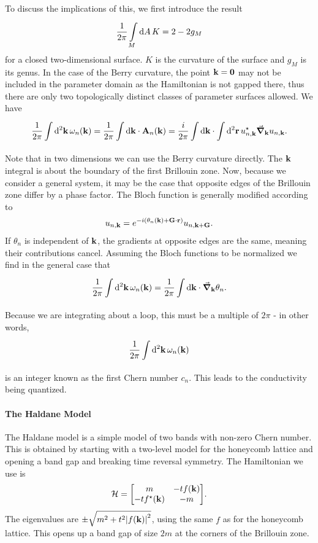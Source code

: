 To discuss the implications of this, we first introduce the result
\begin{align*}
	\frac{1}{2\pi}\int\limits_{M}^{}\dd{A}K = 2 - 2g_{M}
\end{align*}
for a closed two-dimensional surface. $K$ is the curvature of the surface and $g_{M}$ is its genus. In the case of the Berry curvature, the point $\vb{k} = \vb{0}$ may not be included in the parameter domain as the Hamiltonian is not gapped there, thus there are only two topologically distinct classes of parameter surfaces allowed. We have
\begin{align*}
	\frac{1}{2\pi}\int\limits_{}^{}\dd[2]{\vb{k}}\omega_{n}(\vb{k}) = \frac{1}{2\pi}\int\limits_{}^{}\dd{\vb{k}}\cdot\vb{A}_{n}(\vb{k}) = \frac{i}{2\pi}\int\limits_{}^{}\dd{\vb{k}}\cdot\int\limits_{}^{}\dd[2]{\vb{r}}u_{n, \vb{k}}^{\star}\grad_{\vb{k}}u_{n, \vb{k}}.
\end{align*}
Note that in two dimensions we can use the Berry curvature directly. The $\vb{k}$ integral is about the boundary of the first Brillouin zone. Now, because we consider a general system, it may be the case that opposite edges of the Brillouin zone differ by a phase factor. The Bloch function is generally modified according to
\begin{align*}
	u_{n, \vb{k}} = e^{-i(\theta_{n}(\vb{k}) + \vb{G}\cdot\vb{r})}u_{n, \vb{k} + \vb{G}}.
\end{align*}
If $\theta_{n}$ is independent of $\vb{k}$, the gradients at opposite edges are the same, meaning their contributions cancel. Assuming the Bloch functions to be normalized we find in the general case that
\begin{align*}
	\frac{1}{2\pi}\int\limits_{}^{}\dd[2]{\vb{k}}\omega_{n}(\vb{k}) = \frac{1}{2\pi}\int\limits_{}^{}\dd{\vb{k}}\cdot\grad_{\vb{k}}\theta_{n}.
\end{align*}
Because we are integrating about a loop, this must be a multiple of $2\pi$ - in other words,
\begin{align*}
	\frac{1}{2\pi}\int\limits_{}^{}\dd[2]{\vb{k}}\omega_{n}(\vb{k})
\end{align*}
is an integer known as the first Chern number $c_{n}$. This leads to the conductivity being quantized.

\paragraph{The Haldane Model}
The Haldane model is a simple model of two bands with non-zero Chern number. This is obtained by starting with a two-level model for the honeycomb lattice and opening a band gap and breaking time reversal symmetry. The Hamiltonian we use is
\begin{align*}
	\ham = \mqty[
		m              & -tf(\vb{k}) \\
		-tf\cc(\vb{k}) & -m
	].
\end{align*}
The eigenvalues are $\pm\sqrt{m^{2} + t^{2}\abs{f(\vb{k})}^{2}}$, using the same $f$ as for the honeycomb lattice. This opens up a band gap of size $2m$ at the corners of the Brillouin zone.

